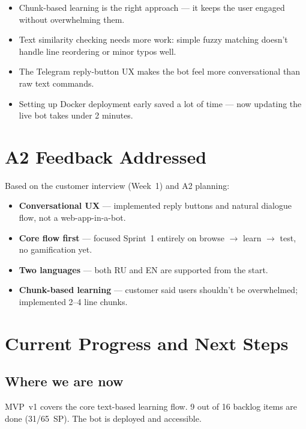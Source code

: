 \documentclass[11pt, a4paper]{article}
\begin{document}
\begin{itemize}
    \item Chunk-based learning is the right approach --- it keeps the user engaged without overwhelming them.
    \item Text similarity checking needs more work: simple fuzzy matching doesn't handle line reordering or minor typos well.
    \item The Telegram reply-button UX makes the bot feel more conversational than raw text commands.
    \item Setting up Docker deployment early saved a lot of time --- now updating the live bot takes under 2 minutes.
\end{itemize}


\section{A2 Feedback Addressed}

Based on the customer interview (Week~1) and A2 planning:
\begin{itemize}
    \item \textbf{Conversational UX} --- implemented reply buttons and natural dialogue flow, not a web-app-in-a-bot.
    \item \textbf{Core flow first} --- focused Sprint~1 entirely on browse $\rightarrow$ learn $\rightarrow$ test, no gamification yet.
    \item \textbf{Two languages} --- both RU and EN are supported from the start.
    \item \textbf{Chunk-based learning} --- customer said users shouldn't be overwhelmed; implemented 2--4 line chunks.
\end{itemize}


\section{Current Progress and Next Steps}

\subsection*{Where we are now}
MVP~v1 covers the core text-based learning flow. 9 out of 16 backlog items are done (31/65~SP). The bot is deployed and accessible.
\end{document}
